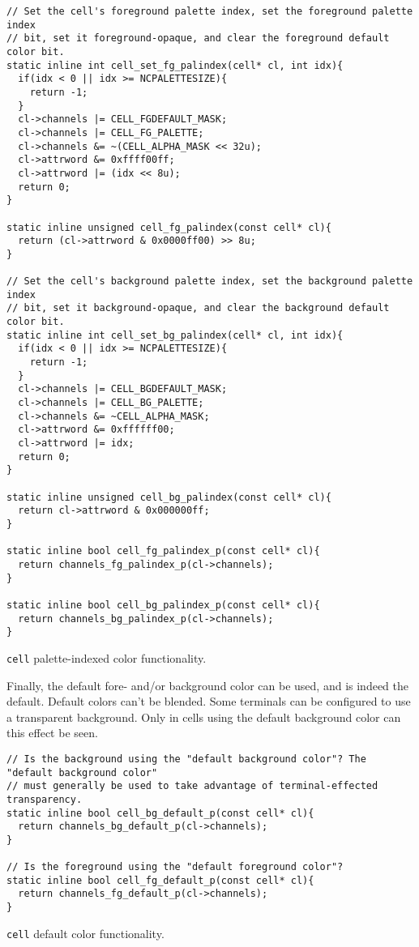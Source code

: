 \begin{listing}[!htbp]
\begin{verbatim}
// Set the cell's foreground palette index, set the foreground palette index
// bit, set it foreground-opaque, and clear the foreground default color bit.
static inline int cell_set_fg_palindex(cell* cl, int idx){
  if(idx < 0 || idx >= NCPALETTESIZE){
    return -1;
  }
  cl->channels |= CELL_FGDEFAULT_MASK;
  cl->channels |= CELL_FG_PALETTE;
  cl->channels &= ~(CELL_ALPHA_MASK << 32u);
  cl->attrword &= 0xffff00ff;
  cl->attrword |= (idx << 8u);
  return 0;
}

static inline unsigned cell_fg_palindex(const cell* cl){
  return (cl->attrword & 0x0000ff00) >> 8u;
}

// Set the cell's background palette index, set the background palette index
// bit, set it background-opaque, and clear the background default color bit.
static inline int cell_set_bg_palindex(cell* cl, int idx){
  if(idx < 0 || idx >= NCPALETTESIZE){
    return -1;
  }
  cl->channels |= CELL_BGDEFAULT_MASK;
  cl->channels |= CELL_BG_PALETTE;
  cl->channels &= ~CELL_ALPHA_MASK;
  cl->attrword &= 0xffffff00;
  cl->attrword |= idx;
  return 0;
}

static inline unsigned cell_bg_palindex(const cell* cl){
  return cl->attrword & 0x000000ff;
}

static inline bool cell_fg_palindex_p(const cell* cl){
  return channels_fg_palindex_p(cl->channels);
}

static inline bool cell_bg_palindex_p(const cell* cl){
  return channels_bg_palindex_p(cl->channels);
}
\end{verbatim}
\caption{\texttt{cell} palette-indexed color functionality.}
\label{listing:cellpalette}
\end{listing}

Finally, the default fore- and/or background color can be used, and is indeed
the default. Default colors can't be blended. Some terminals can be configured
to use a transparent background. Only in cells using the default background
color can this effect be seen.

\begin{listing}[!htbp]
\begin{verbatim}
// Is the background using the "default background color"? The "default background color"
// must generally be used to take advantage of terminal-effected transparency.
static inline bool cell_bg_default_p(const cell* cl){
  return channels_bg_default_p(cl->channels);
}

// Is the foreground using the "default foreground color"?
static inline bool cell_fg_default_p(const cell* cl){
  return channels_fg_default_p(cl->channels);
}
\end{verbatim}
\caption{\texttt{cell} default color functionality.}
\end{listing}

